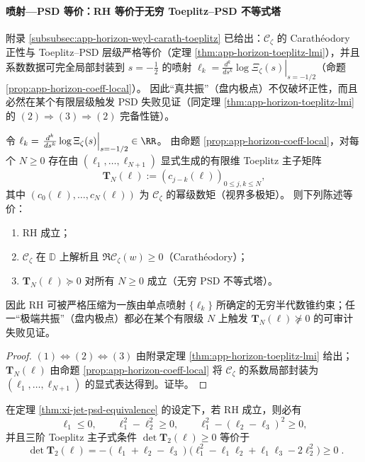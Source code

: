 \paragraph{喷射—PSD 等价：RH 等价于无穷 Toeplitz--PSD 不等式塔}
附录 \ref{subsubsec:app-horizon-weyl-carath-toeplitz} 已给出：\(\mathscr{C}_{\zeta}\) 的 Carath\'eodory 正性与 Toeplitz--PSD 层级严格等价（定理 \ref{thm:app-horizon-toeplitz-lmi}），并且系数数据可完全局部封装到 \(s=-\tfrac12\) 的喷射
\(\ell_k=\left.\frac{d^k}{ds^k}\log\Xi_{\zeta}(s)\right|_{s=-1/2}\)（命题 \ref{prop:app-horizon-coeff-local}）。
因此“真共振”（盘内极点）不仅破坏正性，而且必然在某个有限层级触发 PSD 失败见证（同定理 \ref{thm:app-horizon-toeplitz-lmi} 的 \((2)\Rightarrow(3)\Rightarrow(2)\) 完备性链）。

\begin{theorem}\label{thm:xi-jet-psd-equivalence}
令 \(\ell_k=\left.\frac{d^k}{ds^k}\log\Xi_{\zeta}(s)\right|_{s=-1/2}\in\RR\)。
由命题 \ref{prop:app-horizon-coeff-local}，对每个 \(N\ge 0\) 存在由 \((\ell_1,\dots,\ell_{N+1})\) 显式生成的有限维 Toeplitz 主子矩阵
\[
\mathbf{T}_N(\ell):=(c_{j-k}(\ell))_{0\le j,k\le N},
\]
其中 \((c_0(\ell),\dots,c_N(\ell))\) 为 \(\mathscr{C}_{\zeta}\) 的幂级数矩（视界多极矩）。
则下列陈述等价：
\begin{enumerate}
  \item RH 成立；
  \item \(\mathscr{C}_{\zeta}\) 在 \(\mathbb{D}\) 上解析且 \(\Re\mathscr{C}_{\zeta}(w)\ge 0\)（Carath\'eodory）；
  \item \(\mathbf{T}_N(\ell)\succeq 0\) 对所有 \(N\ge 0\) 成立（无穷 PSD 不等式塔）。
\end{enumerate}
因此 RH 可被严格压缩为一族由单点喷射 \(\{\ell_k\}\) 所确定的无穷半代数锥约束；任一“极端共振”（盘内极点）都必在某个有限级 \(N\) 上触发 \(\mathbf{T}_N(\ell)\nsucceq 0\) 的可审计失败见证。
\end{theorem}

\begin{proof}
\((1)\Leftrightarrow(2)\Leftrightarrow(3)\) 由附录定理 \ref{thm:app-horizon-toeplitz-lmi} 给出；
\(\mathbf{T}_N(\ell)\) 由命题 \ref{prop:app-horizon-coeff-local} 将 \(\mathscr{C}_{\zeta}\) 的系数局部封装为 \((\ell_1,\dots,\ell_{N+1})\) 的显式表达得到。证毕。
\end{proof}

\begin{corollary}[低阶必要不等式（示例）]\label{cor:xi-jet-low-order-inequalities}
在定理 \ref{thm:xi-jet-psd-equivalence} 的设定下，若 RH 成立，则必有
\[
\ell_1\le 0,\qquad
\ell_1^{2}-\ell_2^{2}\ge 0,\qquad
\ell_1^{2}-(\ell_2-\ell_3)^{2}\ge 0,
\]
并且三阶 Toeplitz 主子式条件 \(\det\mathbf{T}_2(\ell)\ge 0\) 等价于
\[
\boxed{\;
\det\mathbf{T}_2(\ell)
=-(\ell_1+\ell_2-\ell_3)\bigl(\ell_1^2-\ell_1\ell_2+\ell_1\ell_3-2\ell_2^2\bigr)\ge 0\; }.
\]
\end{corollary}

